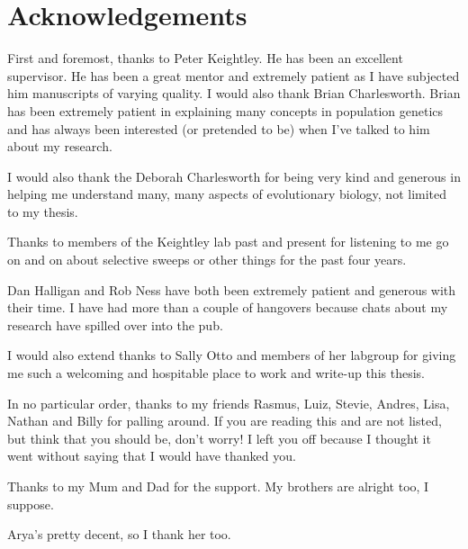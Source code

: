 \chapter{Acknowledgements}

First and foremost, thanks to Peter Keightley. He has been an excellent supervisor. He has been a great mentor and extremely patient as I have subjected him manuscripts of varying quality. I would also thank Brian Charlesworth. Brian has been extremely patient in explaining many concepts in population genetics and has always been interested (or pretended to be) when I've talked to him about my research.

I would also thank the Deborah Charlesworth for being very kind and generous in helping me understand many, many aspects of evolutionary biology, not limited to my thesis.

Thanks to members of the Keightley lab past and present for listening to me go on and on about selective sweeps or other things for the past four years.

Dan Halligan and Rob Ness have both been extremely patient and generous with their time. I have had more than a couple of hangovers because chats about my research have spilled over into the pub.

I would also extend thanks to Sally Otto and members of her labgroup for giving me such a welcoming and hospitable place to work and write-up this thesis.

In no particular order, thanks to my friends Rasmus, Luiz, Stevie, Andres, Lisa, Nathan and Billy for palling around. If you are reading this and are not listed, but think that you should be, don't worry! I left you off because I thought it went without saying that I would have thanked you.

Thanks to my Mum and Dad for the support. My brothers are alright too, I suppose.

Arya's pretty decent, so I thank her too.